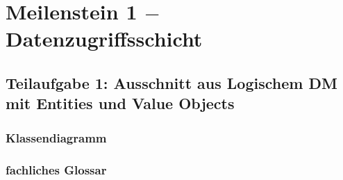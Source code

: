 \section{Meilenstein 1 $-$ Datenzugriffsschicht}

\subsection{Teilaufgabe 1: Ausschnitt aus Logischem DM mit Entities und Value Objects}

\subsubsection{Klassendiagramm}




\subsubsection{fachliches Glossar}

